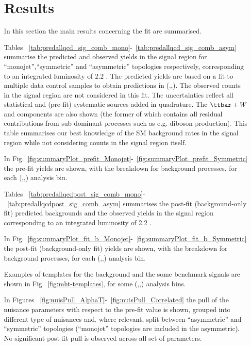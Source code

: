 \section{Results}
\label{sec:results}

In this section the main results concerning the fit are summarised. 

Tables ~\ref{tab:predallqcd_sig_comb_mono}-~\ref{tab:predallqcd_sig_comb_asym} summarise 
the predicted and observed yields in the signal region 
for ``monojet'',``symmetric'' and ``asymmetric'' topologies respectively, 
corresponding to an integrated luminosity of 2.2 \ifb.
The predicted yields are based on a fit to multiple data control samples to obtain predictions in (\nj,\nb,\scalht). 
The observed counts in the signal region are not considered in this fit. 
The uncertainties reflect all statistical and (pre-fit) systematic sources added in quadrature. 
The $\ttbar+W$ and \znunu components are also shown (the former of which contains all residual contributions from sub-dominant processes such as e.g. diboson production). 
This table summarises our best knowledge of the SM background rates in the signal region while not considering counts in the signal region itself. 

In Fig.~\ref{fig:summaryPlot_prefit_Monojet}-~\ref{fig:summaryPlot_prefit_Symmetric} the pre-fit yields 
are shown, with the breakdown for background processes, for each (\njet,\nb,\scalht) analysis bin. 

Tables ~\ref{tab:predallqcdpost_sig_comb_mono}-~\ref{tab:predallqcdpost_sig_comb_asym} summarises the post-fit (background-only fit) predicted backgrounds and the 
observed yields in the signal region corresponding to an integrated luminosity of 2.2 \ifb. 

In Fig.~\ref{fig:summaryPlot_fit_b_Monojet}-~\ref{fig:summaryPlot_fit_b_Symmetric} the post-fit (background-only fit) yields 
are shown, with the breakdown for background processes, for each (\njet,\nb,\scalht) analysis bin. 

Examples of \mht templates for the background and the some benchmark signals are shown in Fig.~\ref{fig:mht-templates}, 
for some (\njet,\nb,\scalht) analysis bins. 

In Figures ~\ref{fig:nuisPull_AlphaT}-~\ref{fig:nuisPull_Correlated} the pull 
of the nuisance parameters with respect to the pre-fit value is shown, 
grouped into different type of nuisances and, where relevant, 
split between ``asymmetric'' and ``symmetric'' topologies 
(``monojet'' topologies are included in the asymmetric). \\
No significant post-fit pull is observed across all set of parameters. 

